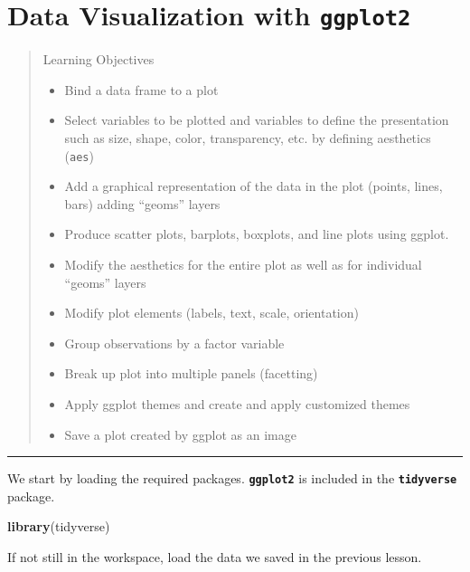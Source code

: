 \documentclass[]{book}
\newenvironment{Shaded}{\begin{snugshade}}{\end{snugshade}}
\newcommand{\KeywordTok}[1]{\textcolor[rgb]{0.13,0.29,0.53}{\textbf{#1}}}
\newcommand{\NormalTok}[1]{#1}
\providecommand{\tightlist}{%
  \setlength{\itemsep}{0pt}\setlength{\parskip}{0pt}}
\theoremstyle{definition}
\theoremstyle{definition}
\theoremstyle{definition}
\theoremstyle{remark}
\begin{document}
\chapter{\texorpdfstring{Data Visualization with
\texttt{ggplot2}}{Data Visualization with ggplot2}}\label{data-visualization-with-ggplot2}

\begin{quote}
Learning Objectives

\begin{itemize}
\tightlist
\item
  Bind a data frame to a plot
\item
  Select variables to be plotted and variables to define the
  presentation such as size, shape, color, transparency, etc. by
  defining aesthetics (\texttt{aes})
\item
  Add a graphical representation of the data in the plot (points, lines,
  bars) adding ``geoms'' layers
\item
  Produce scatter plots, barplots, boxplots, and line plots using
  ggplot.
\item
  Modify the aesthetics for the entire plot as well as for individual
  ``geoms'' layers
\item
  Modify plot elements (labels, text, scale, orientation)
\item
  Group observations by a factor variable
\item
  Break up plot into multiple panels (facetting)
\item
  Apply ggplot themes and create and apply customized themes
\item
  Save a plot created by ggplot as an image
\end{itemize}
\end{quote}

\begin{center}\rule{0.5\linewidth}{\linethickness}\end{center}

We start by loading the required packages. \textbf{\texttt{ggplot2}} is
included in the \textbf{\texttt{tidyverse}} package.

\begin{Shaded}
\begin{Highlighting}[]
\KeywordTok{library}\NormalTok{(tidyverse)}
\end{Highlighting}
\end{Shaded}

If not still in the workspace, load the data we saved in the previous
lesson.
\end{document}
